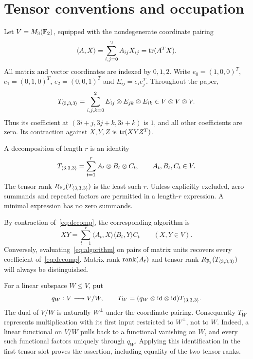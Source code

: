 \section{Tensor conventions and occupation}\label{sec:preliminaries}

Let $V=M_3(\mathbb F_2)$, equipped with the nondegenerate coordinate pairing
\[
 \langle A,X\rangle=\sum_{i,j=0}^2 A_{ij}X_{ij}=\operatorname{tr}(A^TX).
\]
All matrix and vector coordinates are indexed by $0,1,2$. Write
$e_0=(1,0,0)^T$, $e_1=(0,1,0)^T$, $e_2=(0,0,1)^T$ and
$E_{ij}=e_i e_j^T$. Throughout the paper,
\begin{equation}\label{eq:tensor}
 T_{\langle3,3,3\rangle}=\sum_{i,j,k=0}^2 E_{ij}\otimes E_{jk}\otimes E_{ik}
   \in V\otimes V\otimes V.
\end{equation}
Thus its coefficient at $(3i+j,3j+k,3i+k)$ is $1$, and all other
coefficients are zero. Its contraction against $X,Y,Z$ is
$\operatorname{tr}(XYZ^T)$.

\begin{definition}
A decomposition of length $r$ is an identity
\begin{equation}\label{eq:decomp}
 T_{\langle3,3,3\rangle}=\sum_{t=1}^r A_t\otimes B_t\otimes C_t,
 \qquad A_t,B_t,C_t\in V.
\end{equation}
The tensor rank $R_{\mathbb F_2}(T_{\langle3,3,3\rangle})$ is the least such $r$. Unless explicitly
excluded, zero summands and repeated factors are permitted in a
length-$r$ expression. A minimal expression has no zero summands.
\end{definition}

By contraction of~\eqref{eq:decomp}, the corresponding algorithm is
\begin{equation}\label{eq:algorithm}
 XY=\sum_{t=1}^r\langle A_t,X\rangle
                      \langle B_t,Y\rangle C_t
 \qquad(X,Y\in V).
\end{equation}
Conversely, evaluating~\eqref{eq:algorithm} on pairs of matrix units
recovers every coefficient of~\eqref{eq:decomp}. Matrix rank
$\operatorname{rank}(A_t)$ and tensor rank $R_{\mathbb F_2}(T_{\langle3,3,3\rangle})$ will always be distinguished.

For a linear subspace $W\leq V$, put
\[
 q_W:V\longrightarrow V/W,\qquad
 T_W=(q_W\otimes\mathrm{id}\otimes\mathrm{id})T_{\langle3,3,3\rangle}.
\]
The dual of $V/W$ is naturally $W^\perp$ under the coordinate pairing.
Consequently $T_W$ represents multiplication with its first input
restricted to $W^\perp$, not to $W$. Indeed, a linear functional on
$V/W$ pulls back to a functional vanishing on $W$, and every such
functional factors uniquely through $q_W$. Applying this identification
in the first tensor slot proves the assertion, including equality of
the two tensor ranks.

